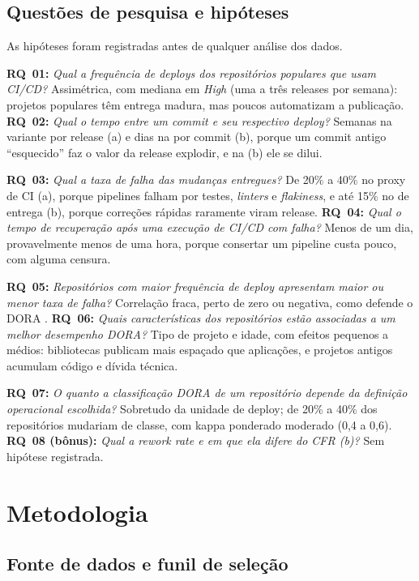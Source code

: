 \documentclass[12pt]{article}
\begin{document}
\subsection{Questões de pesquisa e hipóteses}
\label{sec:hipoteses}

As hipóteses foram registradas antes de qualquer análise dos dados.

\textbf{RQ~01:} \emph{Qual a frequência de deploys dos repositórios populares
que usam CI/CD?} Assimétrica, com mediana em \emph{High} (uma a três releases
por semana): projetos populares têm entrega madura, mas poucos automatizam a
publicação. \textbf{RQ~02:} \emph{Qual o tempo entre um commit e seu respectivo
deploy?} Semanas na variante por release (a) e dias na por commit (b), porque
um commit antigo ``esquecido'' faz o valor da release explodir, e na (b) ele se
dilui.

\textbf{RQ~03:} \emph{Qual a taxa de falha das mudanças entregues?} De 20\% a
40\% no proxy de CI (a), porque pipelines falham por testes, \emph{linters} e
\emph{flakiness}, e até 15\% no de entrega (b), porque correções rápidas
raramente viram release. \textbf{RQ~04:} \emph{Qual o tempo de recuperação após
uma execução de CI/CD com falha?} Menos de um dia, provavelmente menos de uma
hora, porque consertar um pipeline custa pouco, com alguma censura.

\textbf{RQ~05:} \emph{Repositórios com maior frequência de deploy apresentam
maior ou menor taxa de falha?} Correlação fraca, perto de zero ou negativa, como
defende o DORA \cite{forsgren2018}. \textbf{RQ~06:} \emph{Quais características
dos repositórios estão associadas a um melhor desempenho DORA?} Tipo de projeto
e idade, com efeitos pequenos a médios: bibliotecas publicam mais espaçado que
aplicações, e projetos antigos acumulam código e dívida técnica.

\textbf{RQ~07:} \emph{O quanto a classificação DORA de um repositório depende
da definição operacional escolhida?} Sobretudo da unidade de deploy; de 20\% a
40\% dos repositórios mudariam de classe, com kappa ponderado moderado (0,4 a
0,6). \textbf{RQ~08 (bônus):} \emph{Qual a rework rate e em que ela difere do
CFR (b)?} Sem hipótese registrada.

\section{Metodologia}
\label{sec:metodologia}

\subsection{Fonte de dados e funil de seleção}
\label{sec:fonte}
\end{document}
